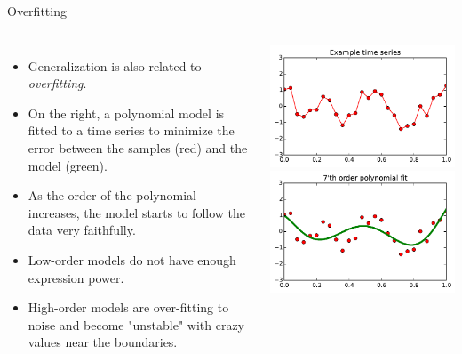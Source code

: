 \documentclass[10pt, aspectratio=169]{beamer} %
\newcommand{\leveys}{0.75\textwidth}
\begin{document}
\renewcommand{\leveys}{1.0\columnwidth}

\begin{frame}{Overfitting}
\begin{columns}
\begin{itemize}
\item Generalization is also related to \emph{overfitting}.
\item On the right, a polynomial model is fitted to a time series to minimize the
error between the samples (red) and the model (green).
\item As the order of the polynomial increases, the model starts to follow the data 
very faithfully.
\item Low-order models do not have enough expression power.
\item High-order models are over-fitting to noise and become "unstable" with crazy values near the boundaries.
\end{itemize}
\includegraphics[width=\leveys]{timeSeries.pdf}\\
\includegraphics[width=\leveys]{timeSeries_7.pdf}\\

\end{columns}
\end{frame}
\end{document}
